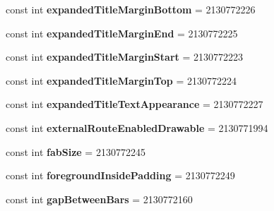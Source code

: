 \begin{DoxyCompactItemize}
const int {\bfseries expanded\+Title\+Margin\+Bottom} = 2130772226
\item 
\mbox{\label{class_sample_app_1_1_droid_1_1_resource_1_1_attribute_a04f715031cf996cd51daf991a69dbae0}} 
const int {\bfseries expanded\+Title\+Margin\+End} = 2130772225
\item 
\mbox{\label{class_sample_app_1_1_droid_1_1_resource_1_1_attribute_a42b2615ac2fed7afca235d117dc0a865}} 
const int {\bfseries expanded\+Title\+Margin\+Start} = 2130772223
\item 
\mbox{\label{class_sample_app_1_1_droid_1_1_resource_1_1_attribute_ae1d981c606e1c737f1b688a4fcc4ca18}} 
const int {\bfseries expanded\+Title\+Margin\+Top} = 2130772224
\item 
\mbox{\label{class_sample_app_1_1_droid_1_1_resource_1_1_attribute_a4b3aac65f559fcccf9162a1c009e4467}} 
const int {\bfseries expanded\+Title\+Text\+Appearance} = 2130772227
\item 
\mbox{\label{class_sample_app_1_1_droid_1_1_resource_1_1_attribute_a3976e83bf59f352b656ca98a0009ed8b}} 
const int {\bfseries external\+Route\+Enabled\+Drawable} = 2130771994
\item 
\mbox{\label{class_sample_app_1_1_droid_1_1_resource_1_1_attribute_a72cb58af51b1ac6c3aa503b77b17c94a}} 
const int {\bfseries fab\+Size} = 2130772245
\item 
\mbox{\label{class_sample_app_1_1_droid_1_1_resource_1_1_attribute_a3bd64e96ba90bbfa20dbe50c93bb092f}} 
const int {\bfseries foreground\+Inside\+Padding} = 2130772249
\item 
\mbox{\label{class_sample_app_1_1_droid_1_1_resource_1_1_attribute_afc78bb5afc2b7e5ab23fac4f03ec7c6d}} 
const int {\bfseries gap\+Between\+Bars} = 2130772160
\item 

\end{DoxyCompactItemize}
